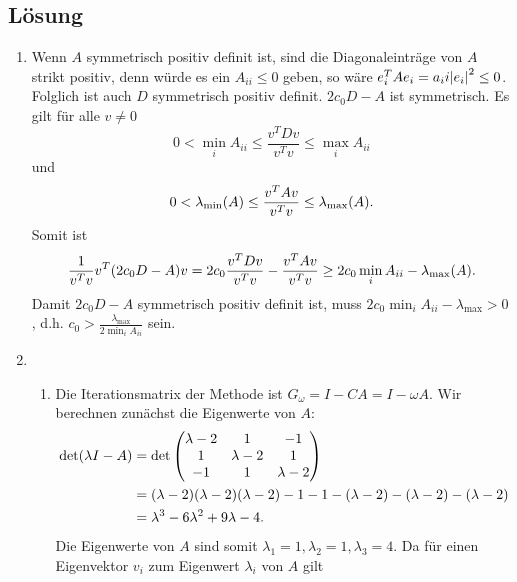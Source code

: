 \documentclass{exercise}
\begin{document}
    \subsection*{Lösung}
    \begin{enumerate}
        \item Wenn \(A\) symmetrisch positiv definit ist, sind die Diagonaleinträge von \(A\) strikt positiv, denn würde es ein \(A_{ii} \le 0\) geben, so wäre \(e_i^T Ae_i = a_ii \absolute*{e_i}^2 \le 0\).
        Folglich ist auch \(D\) symmetrisch positiv definit.
        \(2c_0 D - A\) ist symmetrisch.
        Es gilt für alle \(v \ne 0\)
        \[
            0 < \min_i A_{ii} \le \frac{v^T Dv}{v^T v} \le \max_i A_{ii}
        \]
        und
        \[
            0 < \lambda_{\text{min}}\parentheses*{A} \le \frac{v^T Av}{v^T v} \le \lambda_{\text{max}}\parentheses*{A}.
        \]
        Somit ist
        \[
            \frac{1}{v^T v}v^T \parentheses*{2c_0 D - A}v = 2c_0 \frac{v^T Dv}{v^T v} - \frac{v^T Av}{v^T v} \ge 2c_0 \min_i A_{ii} - \lambda_{\text{max}}\parentheses*{A}.
        \]
        Damit \(2c_0 D - A\) symmetrisch positiv definit ist, muss \(2c_0 \min_i A_{ii} - \lambda_{\text{max}} > 0\), d.h. \(c_0 > \frac{\lambda_{\text{max}}}{2\min_i A_{ii}}\) sein.
        \item
        \begin{enumerate}
            \item Die Iterationsmatrix der Methode ist \(G_\omega = I - CA = I - \omega A\).
            Wir berechnen zunächst die Eigenwerte von \(A\):
            \begin{align*}
                \det\parentheses*{\lambda I - A} &= \det\begin{pmatrix}
                    \lambda - 2 & 1 & -1\\
                    1 & \lambda - 2 & 1\\
                    -1 & 1 & \lambda - 2
                \end{pmatrix}\\
                &= \parentheses*{\lambda - 2}\parentheses*{\lambda - 2}\parentheses*{\lambda - 2} - 1 - 1 - \parentheses*{\lambda - 2} - \parentheses*{\lambda - 2} - \parentheses*{\lambda - 2}\\
                &= \lambda^3 - 6\lambda^2 + 9\lambda - 4.
            \end{align*}
            Die Eigenwerte von \(A\) sind somit \(\lambda_1 = 1, \lambda_2 = 1, \lambda_3 = 4\).
            Da für einen Eigenvektor \(v_i\) zum Eigenwert \(\lambda_i\) von \(A\) gilt

\end{enumerate}
\end{enumerate}
\end{document}
